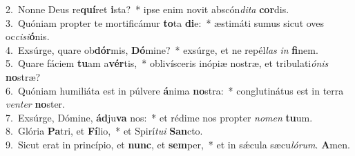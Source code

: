 {2.~}Nonne Deus re\textbf{quí}ret \textbf{i}sta?~* ipse enim novit abscón\textit{di}\textit{ta} \textbf{cor}dis.\\
{3.~}Quóniam propter te mortificámur \textbf{to}ta \textbf{di}e:~* æstimáti sumus sicut oves oc\textit{ci}\textit{si}\textbf{ó}nis.\\
{4.~}Exsúrge, quare ob\textbf{dór}mis, \textbf{Dó}mine?~* exsúrge, et ne repél\textit{las} \textit{in} \textbf{fi}nem.\\
{5.~}Quare fáciem \textbf{tu}am a\textbf{vér}tis,~* oblivísceris inópiæ nostræ, et tribulati\textit{ó}\textit{nis} \textbf{no}stræ?\\
{6.~}Quóniam humiliáta est in púlvere \textbf{á}nima \textbf{no}stra:~* conglutinátus est in terra \textit{ven}\textit{ter} \textbf{no}ster.\\
{7.~}Exsúrge, Dómine, \textbf{ád}ju\textbf{va} nos:~* et rédime nos propter \textit{no}\textit{men} \textbf{tu}um.\\
{8.~}Glória \textbf{Pa}tri, et \textbf{Fí}lio,~* et Spirí\textit{tu}\textit{i} \textbf{San}cto.\\
{9.~}Sicut erat in princípio, et \textbf{nunc}, et \textbf{sem}per,~* et in sǽcula sæcu\textit{ló}\textit{rum}. \textbf{A}men.\\

